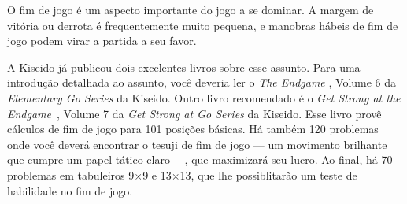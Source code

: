 O fim de jogo é um aspecto importante do jogo a se dominar. A margem de vitória ou derrota é frequentemente muito pequena, e manobras hábeis de fim de jogo podem virar a partida a seu favor.

A Kiseido já publicou dois excelentes livros sobre esse assunto. Para uma introdução detalhada ao assunto, você deveria ler o \emph{The Endgame} \cite{tomoko_bozulich_endgame}, Volume 6 da \emph{Elementary Go Series} da Kiseido. Outro livro recomendado é o \emph{Get Strong at the Endgame}~\cite{bozulich_endgame}, Volume 7 da \emph{Get Strong at Go Series} da Kiseido. Esse livro provê cálculos de fim de jogo para 101 posições básicas. Há também 120 problemas onde você deverá encontrar o tesuji de fim de jogo --- um movimento brilhante que cumpre um papel tático claro ---, que maximizará seu lucro. Ao final, há 70 problemas em tabuleiros 9\(\times\)9 e 13\(\times\)13, que lhe possiblitarão um teste de habilidade no fim de jogo.